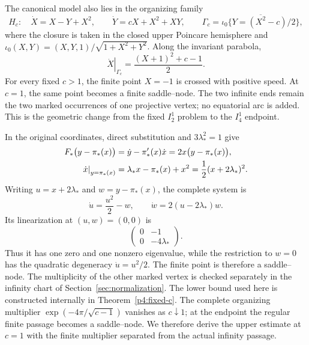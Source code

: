 \documentclass[a4paper,11pt]{article}
\numberwithin{equation}{section}
\theoremstyle{definition}
\theoremstyle{remark}
\begin{document}
The canonical model also lies in the organizing family
\begin{equation}\label{intro:eq-i21-family}
 H_c:\quad \dot X=X-Y+X^2,\qquad
 \dot Y=cX+X^2+XY,
 \qquad
 \Gamma_c=\overline{\iota_0\{Y=(X^2-c)/2\}},
\end{equation}
where the closure is taken in the closed upper Poincare hemisphere and
\(\iota_0(X,Y)=(X,Y,1)/\sqrt{1+X^2+Y^2}\). Along the invariant parabola,
\begin{equation}\label{intro:eq-parabola-speed}
 \left.\dot X\right|_{\Gamma_c}
 =\frac{(X+1)^2+c-1}{2}.
\end{equation}
For every fixed \(c>1\), the finite point \(X=-1\) is crossed with positive
speed. At \(c=1\), the same point becomes a finite saddle--node. The two
infinite ends remain the two marked occurrences of one projective vertex;
no equatorial arc is added. This is the geometric change from the fixed \(I_2^1\) problem to the \(I_4^1\) endpoint.

In the original coordinates, direct substitution and \(3\lambda_*^2=1\) give
\begin{align}
 F_*\bigl(y-\pi_*(x)\bigr)
 &=\dot y-\pi_*'(x)\dot x
   =2x\bigl(y-\pi_*(x)\bigr),\notag\\
 \left.\dot x\right|_{y=\pi_*(x)}
 &=\lambda_*x-\pi_*(x)+x^2
   ={1\over2}(x+2\lambda_*)^2.
 \label{eq:parabola-invariance-speed}
\end{align}
Writing \(u=x+2\lambda_*\) and \(w=y-\pi_*(x)\), the complete system is
\begin{equation}\label{eq:finite-saddle-node-coordinates}
 \dot u=\frac{u^2}{2}-w,\qquad
 \dot w=2(u-2\lambda_*)w .
\end{equation}
Its linearization at \((u,w)=(0,0)\) is
\[
 \begin{pmatrix}0&-1\\[2pt]0&-4\lambda_*\end{pmatrix}.
\]
Thus it has one zero and one nonzero eigenvalue, while the restriction to
\(w=0\) has the quadratic degeneracy \(\dot u=u^2/2\). The finite point is
therefore a saddle--node. The multiplicity of the other marked vertex is checked
separately in the infinity chart of Section~\ref{sec:normalization}.
The lower bound used here is constructed internally in
Theorem~\ref{p4:fixed-c}. The complete organizing multiplier
$\exp(-4\pi/\sqrt{c-1})$ vanishes as $c\downarrow1$;
at the endpoint the regular finite passage becomes a saddle--node.
We therefore derive the upper estimate at $c=1$ with the finite
multiplier separated from the actual infinity passage.
\end{document}
